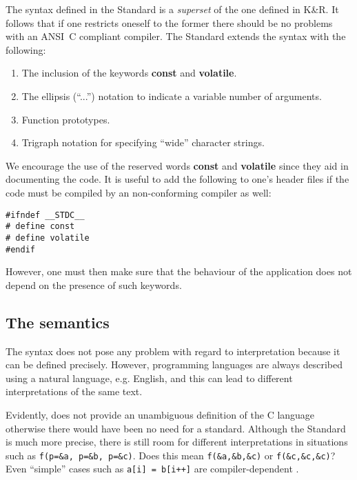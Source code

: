 The syntax defined in the Standard is a {\em superset} of the one defined in K\&R.
It follows that if one restricts oneself to the former there should be no problems
with an ANSI~C compliant compiler. The Standard extends the syntax with the
following:

\begin{enumerate}

\item The inclusion of the keywords {\bf const} and
   {\bf volatile}.

\item The ellipsis (``...'') notation to indicate a variable number
 of arguments.

\item Function prototypes.

\item Trigraph notation for specifying ``wide'' character strings.

\end{enumerate}

We encourage the use of the reserved words {\bf const} and {\bf volatile}
since they aid in documenting the code.
It is useful to add the following to one's header files if the code must
be compiled by an non-conforming compiler as well:
\begin{verbatim}
#ifndef __STDC__
# define const
# define volatile
#endif
\end{verbatim}

However, one must then make sure that the behaviour of the application does not
depend on the presence of such keywords.

\subsection{The semantics}

The syntax does not pose any problem with regard to interpretation because
it can be defined precisely. However, programming languages are always
described using a natural language, e.g. English, and this can lead to
different interpretations of the same text.

Evidently, \cite{kn:KR} does not provide an unambiguous definition
of the C language otherwise there would have been no need for a standard.
Although the Standard is much more precise,
there is still room for different interpretations in situations
such as {\tt f(p=\&a, p=\&b, p=\&c)}. Does this mean {\tt f(\&a,\&b,\&c)} or
{\tt f(\&c,\&c,\&c)}? Even ``simple'' cases such as {\tt a[i] = b[i++]}
are compiler-dependent \cite{kn:style}.


